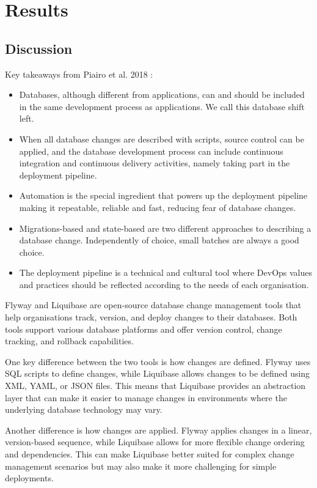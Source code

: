 
\chapter{Results}

\section{Discussion}
%
Key takeaways from Piairo et al. 2018 \cite{Piairo2018}:

\begin{itemize}
	\item Databases, although different from applications, can and should be included in the same development process as applications. We call this database shift left.
	\item When all database changes are described with scripts, source control can be applied, and the database development process can include continuous integration and continuous delivery activities, namely taking part in the deployment pipeline.
	\item Automation is the special ingredient that powers up the deployment pipeline making it repeatable, reliable and fast, reducing fear of database changes.
	\item Migrations-based and state-based are two different approaches to describing a database change. Independently of choice, small batches are always a good choice.
	\item The deployment pipeline is a technical and cultural tool where DevOps values and practices should be reflected according to the needs of each organisation.    
\end{itemize}

%
Flyway and Liquibase are open-source database change management tools that help organisations track, version, and deploy changes to their databases. Both tools support various database platforms and offer version control, change tracking, and rollback capabilities.

One key difference between the two tools is how changes are defined. Flyway uses SQL scripts to define changes, while Liquibase allows changes to be defined using XML, YAML, or JSON files. This means that Liquibase provides an abstraction layer that can make it easier to manage changes in environments where the underlying database technology may vary.

Another difference is how changes are applied. Flyway applies changes in a linear, version-based sequence, while Liquibase allows for more flexible change ordering and dependencies. This can make Liquibase better suited for complex change management scenarios but may also make it more challenging for simple deployments.

